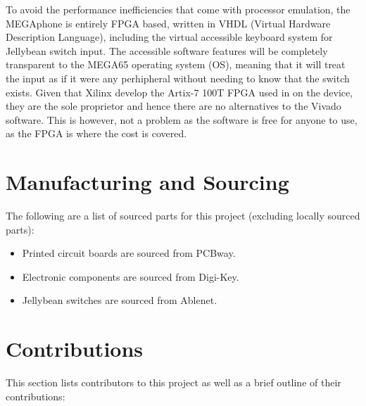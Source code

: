 To avoid the performance inefficiencies that come with processor emulation, the MEGAphone is entirely FPGA based, written in VHDL (Virtual Hardware Description Language), including the virtual accessible keyboard system for Jellybean switch input.
The accessible software features will be completely transparent to the MEGA65 operating system (OS), meaning that it will treat the input as if it were any perhipheral without needing to know that the switch exists.
Given that Xilinx develop the Artix-7 100T FPGA used in on the device, they are the sole proprietor and hence there are no alternatives to the Vivado software.
This is however, not a problem as the software is free for anyone to use, as the FPGA is where the cost is covered.


\section{Manufacturing and Sourcing}

The following are a list of sourced parts for this project (excluding locally sourced parts):

\begin{itemize} 
    \item Printed circuit boards are sourced from PCBway. %
    \item Electronic components are sourced from Digi-Key.
    \item Jellybean switches are sourced from Ablenet.
    \end{itemize}


\section{Contributions}

This section lists contributors to this project as well as a brief outline of their contributions:

